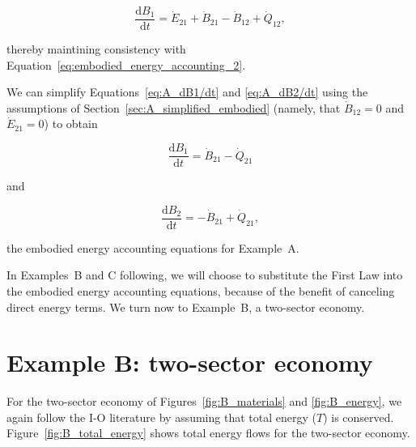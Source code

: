 \begin{equation} \label{eq:A_dB1/dt_waste_outflow}
	\frac{\mathrm{d}B_{1}}{\mathrm{d}t} 
	= \dot{E}_{21}
	+ \dot{B}_{21} 
	- \dot{B}_{12}
	+ \dot{Q}_{12},
\end{equation}

\noindent thereby maintining consistency with
Equation~\ref{eq:embodied_energy_accounting_2}.

We can simplify 
Equations~\ref{eq:A_dB1/dt} and \ref{eq:A_dB2/dt} 
using the assumptions of Section~\ref{sec:A_simplified_embodied} 
(namely, that $\dot{B}_{12} = 0$ and $\dot{E}_{21} = 0$)
to obtain

\begin{equation} \label{eq:A_dB1/dt_simp}
	\frac{\mathrm{d}B_{1}}{\mathrm{d}t} 
	= \dot{B}_{21} 
	- \dot{Q}_{21}
\end{equation}

\noindent and

\begin{equation} \label{eq:A_dB2/dt_simp}
	\frac{\mathrm{d}B_{2}}{\mathrm{d}t} 
	= - \dot{B}_{21}
	+ \dot{Q}_{21},
\end{equation}

\noindent the embodied energy accounting equations for 
Example~A.

In Examples~B and C following, we will choose to substitute
the First Law into the embodied energy accounting equations,
because of the benefit of canceling direct energy terms. 
We turn now to Example~B, a two-sector economy.



\section{Example B: two-sector economy}

For the two-sector economy of Figures~\ref{fig:B_materials}
and \ref{fig:B_energy}, we again follow the I-O literature 
by assuming that total energy ($T$) is conserved. 
Figure~\ref{fig:B_total_energy} shows total energy
flows for the two-sector economy.

